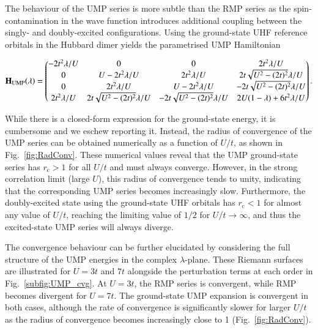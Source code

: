 \documentclass[aps,prb,reprint,noshowkeys,linenumbers,superscriptaddress]{revtex4-1}
\newcommand{\hugh}[1]{\textcolor{hughgreen}{#1}}
\newcommand{\bH}{\mathbf{H}}
\newcommand{\rc}{r_{\text{c}}}
\begin{document}
The behaviour of the UMP series is more subtle than the RMP series as the spin-contamination in the wave function
\hugh{introduces additional coupling between the singly- and doubly-excited configurations.}
Using the ground-state UHF reference orbitals in the Hubbard dimer yields the \hugh{parametrised} UMP Hamiltonian
\begin{widetext}
\begin{equation}
\label{eq:H_UMP}
\bH_\text{UMP}\qty(\lambda) = 
	\begin{pmatrix}
		-2t^2 \lambda/U	&	0									&	0									&	2t^2 \lambda/U		\\
		0				&	U - 2t^2 \lambda/U 					&	2t^2\lambda/U						&	2t \sqrt{U^2 - (2t)^2} \lambda/U	\\
		0				&	2t^2\lambda/U						&	U - 2t^2 \lambda/U 					&	-2t \sqrt{U^2 - (2t)^2} \lambda/U	\\
		2t^2 \lambda/U	&	2t \sqrt{U^2 - (2t)^2} \lambda/U 	&	-2t \sqrt{U^2 - (2t)^2} \lambda/U	&	2U(1-\lambda) + 6t^2\lambda/U		\\
	\end{pmatrix}.
\end{equation}
\end{widetext}
While there is a closed-form expression for the ground-state energy, it is cumbersome and we eschew reporting it.
Instead, the radius of convergence of the UMP series can be obtained numerically as a function of $U/t$, as shown
in Fig.~\ref{fig:RadConv}.
These numerical values reveal that the UMP ground-state series has $\rc > 1$ for all $U/t$ and must always converge.
However, in the strong correlation limit (large $U$), this radius of convergence tends to unity, indicating that
the corresponding UMP series becomes increasingly slow.
Furthermore, the doubly-excited state using the ground-state UHF orbitals has $\rc < 1$ for almost any value 
of $U/t$, reaching the limiting value of $1/2$ for $U/t \rightarrow \infty$, and thus the 
excited-state UMP series will always diverge.
 
The convergence behaviour can be further elucidated by considering the full structure of the UMP energies 
in the complex $\lambda$-plane.
These Riemann surfaces are illustrated for $U = 3t$ and $7t$ alongside the perturbation terms at each order
in Fig.~\ref{subfig:UMP_cvg}.
At $U = 3t$, the RMP series is convergent, while RMP becomes divergent for $U=7t$.
The ground-state UMP expansion is convergent in both cases, although the rate of convergence is significantly slower 
for larger $U/t$ as the radius of convergence becomes increasingly close to 1 (Fig.~\ref{fig:RadConv}).
\end{document}
